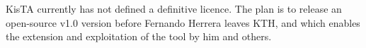 KisTA currently has not defined a definitive licence.
The plan is to release an open-source v1.0 version before Fernando Herrera
leaves KTH, and which enables the extension and exploitation of the tool by him
and others.
